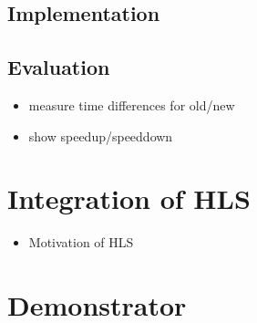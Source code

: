 \documentclass[
	a4paper,
	12pt,
	twoside,
	DIV=10,
	abstracton,
	parskip,
	listof=totoc,
	bibliography=totoc]{scrreprt}
\begin{document}
\section{Implementation}
\section{Evaluation}
\begin{itemize}
\item measure time differences for old/new
\item show speedup/speeddown
\end{itemize}

\chapter{Integration of HLS}
\begin{itemize}
\item Motivation of HLS
\end{itemize}

\chapter{Demonstrator}

\cleardoublepage




\end{document}
